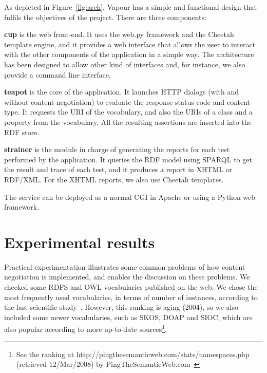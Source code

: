 \documentclass{../templates/llncs}
\begin{document}
As depicted in Figure~\ref{fig:arch}, Vapour has a simple and functional
design that fulfils the objectives of the project. There are three components:

\begin{description}

  \item \textbf{cup} is the web front-end. It uses the web.py framework
        and the Cheetah template engine, and it provides a web interface that allows 
        the user to interact with the other components of the application in a 
        simple way. The architecture has been designed to allow other kind 
        of interfaces and, for instance, we also provide a command line interface.

  \item \textbf{teapot} is the core of the application. It launches
        HTTP dialogs 
        (with and without content negotiation) to evaluate the response
        status code and content-type. It requests the URI of the vocabulary, and 
        also the URIs of a class and a property from the vocabulary. All the resulting assertions are 
        inserted into the RDF store.

  \item \textbf{strainer} is the module in charge of generating the reports for
        each test performed by the application. It queries the RDF model using SPARQL %
        to get the result and trace of each test, and it produces 
        a report in XHTML or RDF/XML. For the XHTML reports, we also use Cheetah 
        templates.

\end{description}

The service can be deployed as a normal CGI in Apache or using a Python web 
framework. %

\section{\label{sec:experimental}Experimental results}

Practical experimentation illustrates some common problems of how
content negotiation is implemented, and enables the discussion on 
these problems. We checked some RDFS and OWL vocabularies published on the web.
We chose the most frequently used vocabularies, in terms of number of
instances, according to the last scientific study~\cite{Li2005}. However,
this ranking is aging (2004), so we also included some newer
vocabularies, such as SKOS, DOAP and SIOC, which are also popular
according to more up-to-date sources\footnote{See the ranking at http://pingthesemanticweb.com/stats/namespaces.php (retrieved 12/Mar/2008) by PingTheSemanticWeb.com~\cite{Bojars2007}}.
\end{document}
